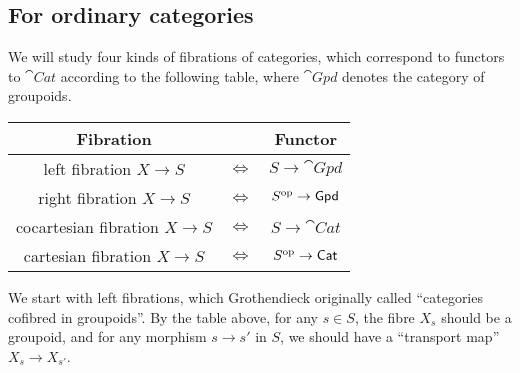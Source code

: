 \subsection{For ordinary categories}

We will study four kinds of fibrations of categories,
which correspond to functors to $\cat{Cat}$
according to the following table,
where $\cat{Gpd}$ denotes the category of groupoids.

\begin{center}
    \begin{tabular}{ccc}
        \textbf{Fibration} & & \textbf{Functor} \\ \hline
        left fibration $X\to S$ & $\Longleftrightarrow$ & $S\to\cat{Gpd}$ \\
        right fibration $X\to S$ & $\Longleftrightarrow$ & $S^{\mathrm{op}}\to\mathsf{Gpd}$ \\
        cocartesian fibration $X\to S$ & $\Longleftrightarrow$ & $S\to\cat{Cat}$ \\
        cartesian fibration $X\to S$ & $\Longleftrightarrow$ & $S^{\mathrm{op}}\to\mathsf{Cat}$ \\
    \end{tabular}
\end{center}

We start with left fibrations,
which Grothendieck originally called ``categories cofibred in groupoids''.
By the table above, for any $s\in S$,
the fibre $X_s$ should be a groupoid,
and for any morphism $s\to s'$ in $S$,
we should have a ``transport map'' $X_s\to X_{s'}$.

